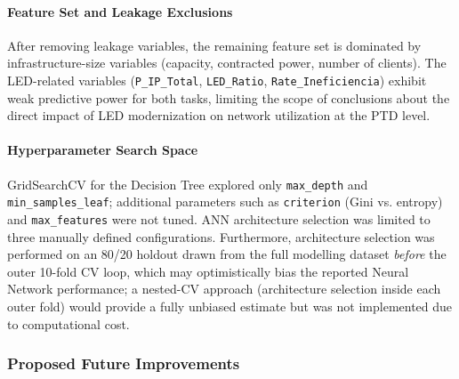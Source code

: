 \documentclass[conference]{IEEEtran}
\begin{document}
\paragraph{Feature Set and Leakage Exclusions}
After removing leakage variables, the remaining feature set is dominated by infrastructure-size variables (capacity, contracted power, number of clients). The LED-related variables (\texttt{P\_IP\_Total}, \texttt{LED\_Ratio}, \texttt{Rate\_Ineficiencia}) exhibit weak predictive power for both tasks, limiting the scope of conclusions about the direct impact of LED modernization on network utilization at the PTD level.

\paragraph{Hyperparameter Search Space}
GridSearchCV for the Decision Tree explored only \texttt{max\_depth} and \texttt{min\_samples\_leaf}; additional parameters such as \texttt{criterion} (Gini vs. entropy) and \texttt{max\_features} were not tuned. ANN architecture selection was limited to three manually defined configurations. Furthermore, architecture selection was performed on an 80/20 holdout drawn from the full modelling dataset \emph{before} the outer 10-fold CV loop, which may optimistically bias the reported Neural Network performance; a nested-CV approach (architecture selection inside each outer fold) would provide a fully unbiased estimate but was not implemented due to computational cost.

\subsubsection{Proposed Future Improvements}
\end{document}
